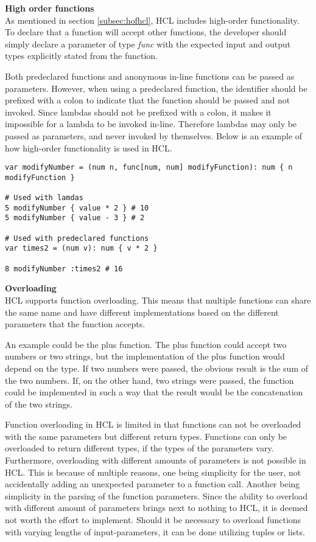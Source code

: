 \textbf{High order functions}\\
As mentioned in section \ref{subsec:hofhcl}, HCL includes high-order functionality. 
To declare that a function will accept other functions, the developer should simply declare a parameter of type \textit{func} with the expected input and output types explicitly stated from the function.

Both predeclared functions and anonymous in-line functions can be passed as parameters. 
However, when using a predeclared function, the identifier should be prefixed with a colon to indicate that the function should be passed and not invoked. 
Since lambdas should not be prefixed with a colon, it makes it impossible for a lambda to be invoked in-line. 
Therefore lambdas may only be passed as parameters, and never invoked by themselves.
Below is an example of how high-order functionality is used in HCL.
\begin{lstlisting}[language=HCL,label=lis:hclTypeDcls,firstnumber=1]
var modifyNumber = (num n, func[num, num] modifyFunction): num { n modifyFunction }

# Used with lamdas
5 modifyNumber { value * 2 } # 10
5 modifyNumber { value - 3 } # 2

# Used with predeclared functions
var times2 = (num v): num { v * 2 }

8 modifyNumber :times2 # 16

\end{lstlisting}

\textbf{Overloading}\\
HCL supports function overloading. 
This means that multiple functions can share the same name and have different implementations based on the different parameters that the function accepts.

An example could be the plus function. 
The plus function could accept two numbers or two strings, but the implementation of the plus function would depend on the type.
If two numbers were passed, the obvious result is the sum of the two numbers.
If, on the other hand, two strings were passed, the function could be implemented in such a way that the result would be the concatenation of the two strings.

Function overloading in HCL is limited in that functions can not be overloaded with the same parameters but different return types. 
Functions can only be overloaded to return different types, if the types of the parameters vary.
Furthermore, overloading with different amounts of parameters is not possible in HCL.
This is because of multiple reasons, one being simplicity for the user, not accidentally adding an unexpected parameter to a function call. 
Another being simplicity in the parsing of the function parameters. 
Since the ability to overload with different amount of parameters brings next to nothing to HCL, it is deemed not worth the effort to implement.
Should it be necessary to overload functions with varying lengths of input-parameters, it can be done utilizing tuples or lists.

